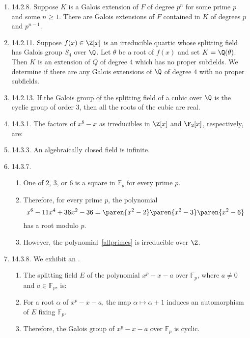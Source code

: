 \documentclass[onesided]{ccg-pset}
\newcommand{\Fp}{\mathbb{F}_p} %
\begin{document}
\begin{enumerate}
\item \label{14.2.8} 14.2.8. 
Suppose $K$ is a Galois extension of $F$ of degree $p^n$ for some prime $p$ and some $n \ge 1$. 
There are Galois extensions of $F$ contained in $K$ of degrees $p$ and $p^{n-1}$.



\item \label{14.2.11} 14.2.11.
Suppose $f(x) \in \Z[x]$ is an irreducible quartic whose splitting field has Galois group $S_4$ over $\Q$. 
Let $\theta$ be a root of $f(x)$ and set $K = \Q(\theta)$. 
Then $K$ is an extension of $Q$ of degree $4$ which has no proper subfields.
We determine if there are any Galois extensions of $\Q$ of degree $4$ with no proper subfields.



\item \label{14.2.13} 14.2.13.
If the Galois group of the splitting field of a cubic over $\Q$ is the cyclic group of order $3$, then all the roots of the cubic are real.

\item \label{14.3.1} 14.3.1.
The factors of $x^8 - x$ as irreducibles in $\Z[x]$ and $\F_2[x]$, respectively, are:


\item \label{14.3.3} 14.3.3.
An algebraically closed field is infinite.


\item \label{14.3.7} 14.3.7.
\begin{enumerate}
    \item One of $2$, $3$, or $6$ is a square in $\Fp$ for every prime $p$.
    \item Therefore, for every prime $p$, the polynomial 
        \begin{equation}
            \label{allprimes}
        x^6 - 11x^{4} + 36x^{2} - 36 = \paren{x^{2} -2} \paren{x^{2} -3} \paren{x^{2} -6} 
        \end{equation}
        has a root modulo $p$.
    \item However, the polynomial~\eqref{allprimes} is irreducible over $\Z$.
\end{enumerate}


\item \label{14.3.8} 14.3.8. We exhibit an .
\begin{enumerate}
    \item The splitting field $E$ of the polynomial $x^p - x -a$ over $\Fp$, where $a \neq 0$ and $a \in \Fp$, is:
    \item For a root $\alpha$ of $x^p - x -a$, the map $\alpha \mapsto \alpha + 1$ induces an automorphism of $E$ fixing $\Fp$.
    \item Therefore, the Galois group of $x^p - x -a$ over $\Fp$ is cyclic.
\end{enumerate}
 

\end{enumerate}
\end{document}

